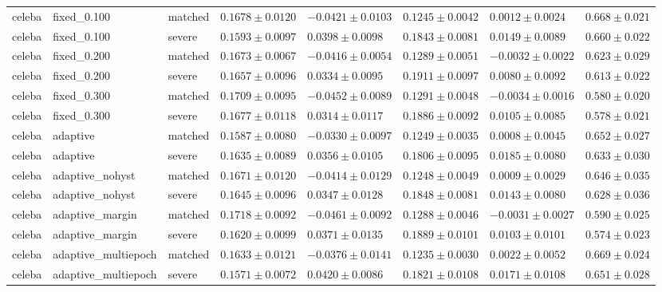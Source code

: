 \begin{table}[!t]
{\begin{tabular}{llllllll}
celeba & fixed\_0.100 & matched & $0.1678\pm0.0120$ & $-0.0421\pm0.0103$ & $0.1245\pm0.0042$ & $0.0012\pm0.0024$ & $0.668\pm0.021$ \\
celeba & fixed\_0.100 & severe & $0.1593\pm0.0097$ & $0.0398\pm0.0098$ & $0.1843\pm0.0081$ & $0.0149\pm0.0089$ & $0.660\pm0.022$ \\
celeba & fixed\_0.200 & matched & $0.1673\pm0.0067$ & $-0.0416\pm0.0054$ & $0.1289\pm0.0051$ & $-0.0032\pm0.0022$ & $0.623\pm0.029$ \\
celeba & fixed\_0.200 & severe & $0.1657\pm0.0096$ & $0.0334\pm0.0095$ & $0.1911\pm0.0097$ & $0.0080\pm0.0092$ & $0.613\pm0.022$ \\
celeba & fixed\_0.300 & matched & $0.1709\pm0.0095$ & $-0.0452\pm0.0089$ & $0.1291\pm0.0048$ & $-0.0034\pm0.0016$ & $0.580\pm0.020$ \\
celeba & fixed\_0.300 & severe & $0.1677\pm0.0118$ & $0.0314\pm0.0117$ & $0.1886\pm0.0092$ & $0.0105\pm0.0085$ & $0.578\pm0.021$ \\
celeba & adaptive & matched & $0.1587\pm0.0080$ & $-0.0330\pm0.0097$ & $0.1249\pm0.0035$ & $0.0008\pm0.0045$ & $0.652\pm0.027$ \\
celeba & adaptive & severe & $0.1635\pm0.0089$ & $0.0356\pm0.0105$ & $0.1806\pm0.0095$ & $0.0185\pm0.0080$ & $0.633\pm0.030$ \\
celeba & adaptive\_nohyst & matched & $0.1671\pm0.0120$ & $-0.0414\pm0.0129$ & $0.1248\pm0.0049$ & $0.0009\pm0.0029$ & $0.646\pm0.035$ \\
celeba & adaptive\_nohyst & severe & $0.1645\pm0.0096$ & $0.0347\pm0.0128$ & $0.1848\pm0.0081$ & $0.0143\pm0.0080$ & $0.628\pm0.036$ \\
celeba & adaptive\_margin & matched & $0.1718\pm0.0092$ & $-0.0461\pm0.0092$ & $0.1288\pm0.0046$ & $-0.0031\pm0.0027$ & $0.590\pm0.025$ \\
celeba & adaptive\_margin & severe & $0.1620\pm0.0099$ & $0.0371\pm0.0135$ & $0.1889\pm0.0101$ & $0.0103\pm0.0101$ & $0.574\pm0.023$ \\
celeba & adaptive\_multiepoch & matched & $0.1633\pm0.0121$ & $-0.0376\pm0.0141$ & $0.1235\pm0.0030$ & $0.0022\pm0.0052$ & $0.669\pm0.024$ \\
celeba & adaptive\_multiepoch & severe & $0.1571\pm0.0072$ & $0.0420\pm0.0086$ & $0.1821\pm0.0108$ & $0.0171\pm0.0108$ & $0.651\pm0.028$ \\
\hline
\end{tabular}
}
\end{table}